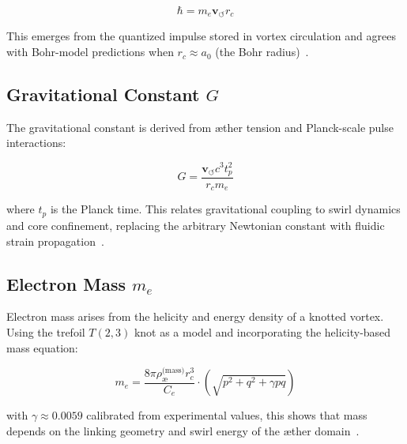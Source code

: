 \documentclass[preprint]{revtex4-2}
\begin{document}
            \begin{equation}
            \hbar = m_e \mathbf{v}_{\scriptscriptstyle\boldsymbol{\circlearrowleft}} r_c
            \label{eq:planck_vam}
            \end{equation}
        
            This emerges from the quantized impulse stored in vortex circulation and agrees with Bohr-model predictions when \( r_c \approx a_0 \) (the Bohr radius)~\cite{moffatt1969knottedness}.
        
            \subsection{Gravitational Constant \boldmath\( G \)}
            The gravitational constant is derived from æther tension and Planck-scale pulse interactions:
        
            \begin{equation}
                G = \frac{\mathbf{v}_{\scriptscriptstyle\boldsymbol{\circlearrowleft}} c^3 t_p^2}{r_c m_e}
            \label{eq:gravity_vam}
            \end{equation}
        
            where \( t_p \) is the Planck time. This relates gravitational coupling to swirl dynamics and core confinement, replacing the arbitrary Newtonian constant with fluidic strain propagation~\cite{volovik2003universe}.
        
            \subsection{Electron Mass \boldmath\( m_e \)}
            Electron mass arises from the helicity and energy density of a knotted vortex. Using the trefoil \( T(2,3) \) knot as a model and incorporating the helicity-based mass equation:
        
            \begin{equation}
                m_e = \frac{8\pi \rho_{\text{\ae}}^\text{(mass)} r_c^3}{C_e} \cdot \left( \sqrt{p^2 + q^2 + \gamma pq} \right)
            \label{eq:electron_mass_vam}
            \end{equation}
        
            with \( \gamma \approx 0.0059 \) calibrated from experimental values, this shows that mass depends on the linking geometry and swirl energy of the æther domain~\cite{kleckner2013knots, moffatt1969knottedness}.
        
\end{document}
